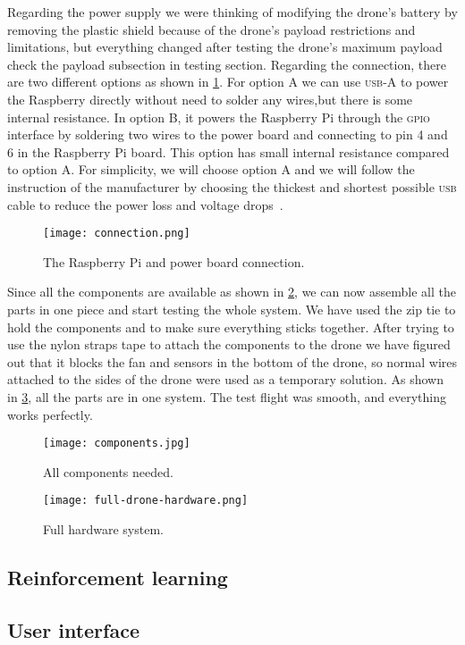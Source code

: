 \documentclass[../main.tex]{subfiles}
\begin{document}
Regarding the power supply we were thinking 
of modifying the drone's battery by removing the 
plastic shield because of the drone's payload restrictions 
and limitations, but everything changed after testing 
the drone's maximum payload check the payload subsection in testing section.
Regarding the connection, there are 
two different options as shown in \cref{fig:connection}.
For option A we can use \textsc{usb}-A to power the Raspberry directly 
without need to solder any wires,but there is some internal resistance.
In option B, it powers the Raspberry Pi through the \textsc{gpio} 
interface by soldering two wires to the power board and 
connecting to pin 4 and 6 in the Raspberry Pi board.
This option has small internal resistance compared to option A.
For simplicity, we will choose option A and we will 
follow the instruction of the manufacturer by choosing 
the thickest and shortest possible \textsc{usb} cable to reduce 
the power loss and voltage drops~\cite{makerfocus}.

\begin{figure}[p]
	\centering
	\texttt{[image: connection.png]}
	\caption{The Raspberry Pi and power board connection.}
	\label{fig:connection}
\end{figure}  

Since all the components are available as shown 
in \cref{fig:components}, we can now assemble 
all the parts in one piece and start testing the whole system.
We have used the zip tie to hold the components and to
make sure everything sticks together. After trying to use the 
nylon straps tape to attach the components to the drone 
we have figured out that it blocks the fan 
and sensors in the bottom of the drone, 
so normal wires attached to the sides of the drone were 
used as a temporary solution. As shown in 
\cref{fig:full-hardware}, all the parts are in one system. 
The test flight was smooth, and everything works perfectly. 

\begin{figure}[p]
	\centering
	\texttt{[image: components.jpg]}
	\caption{All components needed.}
	\label{fig:components}
\end{figure}

\begin{figure}[p]
	\centering
	\texttt{[image: full-drone-hardware.png]}
	\caption{Full hardware system.}
	\label{fig:full-hardware}
\end{figure}  



\subsection{Reinforcement learning}

\lipsum[1]

\subsection{User interface}

\lipsum[1]
\end{document}
